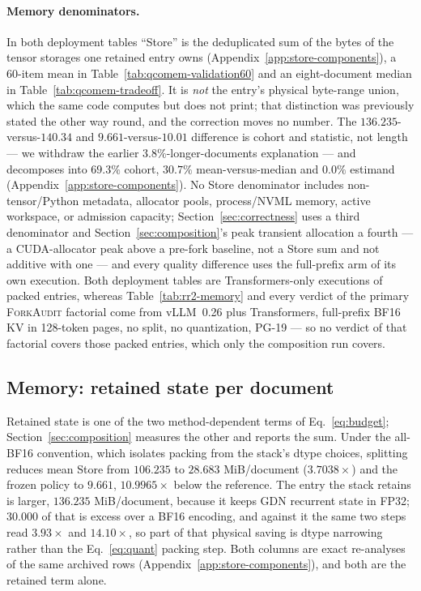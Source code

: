 \documentclass{article}
\newcommand{\method}{\textsc{ForkAudit}}
\begin{document}
\paragraph{Memory denominators.}
\label{sec:denominators}
In both deployment tables ``Store'' is the deduplicated sum of the bytes of the
tensor storages one retained entry owns (Appendix~\ref{app:store-components}), a
60-item mean in Table~\ref{tab:qcomem-validation60} and an eight-document median
in Table~\ref{tab:qcomem-tradeoff}.  It is \emph{not} the entry's physical
byte-range union, which the same code computes but does not print; that
distinction was previously stated the other way round, and the correction moves
no number.  The $136.235$-versus-$140.34$ and $9.661$-versus-$10.01$ difference
is cohort and statistic, not length --- we withdraw the earlier
$3.8\%$-longer-documents explanation --- and decomposes into $69.3\%$ cohort,
$30.7\%$ mean-versus-median and $0.0\%$ estimand
(Appendix~\ref{app:store-components}).  No Store
denominator includes non-tensor/Python metadata, allocator pools, process/NVML
memory, active workspace, or admission capacity;
Section~\ref{sec:correctness} uses a third denominator and
Section~\ref{sec:composition}'s peak transient allocation a fourth --- a
CUDA-allocator peak above a pre-fork baseline, not a Store sum and not additive
with one --- and every quality difference uses the full-prefix arm of its own
execution.  Both deployment tables are Transformers-only executions of packed
entries, whereas Table~\ref{tab:rr2-memory} and every verdict of the primary
\method{} factorial come from vLLM~0.26 plus Transformers, full-prefix BF16 KV in
128-token pages, no split, no quantization, PG-19 --- so no verdict of that
factorial covers those packed entries, which only the composition run covers.
\subsection{Memory: retained state per document}
\label{sec:memory}
Retained state is one of the two method-dependent terms of Eq.~\ref{eq:budget};
Section~\ref{sec:composition} measures the other and reports the sum.  Under the
all-BF16 convention, which isolates packing from the stack's dtype choices,
splitting reduces mean Store from $106.235$ to $28.683$ MiB/document
($3.7038\times$) and the frozen policy to $9.661$, $10.9965\times$ below the
reference.  The entry the
stack retains is larger, $136.235$ MiB/document, because it keeps GDN recurrent
state in FP32; $30.000$ of that is excess over a BF16 encoding, and against it
the same two steps read $3.93\times$ and $14.10\times$, so part of that physical
saving is dtype narrowing rather than the Eq.~\ref{eq:quant} packing step.  Both
columns are exact re-analyses of the same archived rows
(Appendix~\ref{app:store-components}), and both are the retained term alone.
\end{document}
